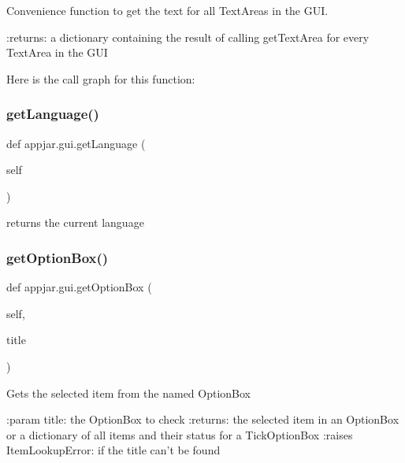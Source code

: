 \begin{DoxyVerb}Convenience function to get the text for all TextAreas in the GUI.

:returns: a dictionary containing the result of calling getTextArea for every TextArea in the GUI
\end{DoxyVerb}
 Here is the call graph for this function\+:
\mbox{\label{classappjar_1_1gui_a456aad9d9af68d845d12657ef103e4f6}} 
\subsubsection{\texorpdfstring{get\+Language()}{getLanguage()}}
{\footnotesize\ttfamily def appjar.\+gui.\+get\+Language (\begin{DoxyParamCaption}\item[{}]{self }\end{DoxyParamCaption})}

\begin{DoxyVerb}returns the current language \end{DoxyVerb}
 \mbox{\label{classappjar_1_1gui_abacd02677277cb43514dcf2298ac3674}} 
\subsubsection{\texorpdfstring{get\+Option\+Box()}{getOptionBox()}}
{\footnotesize\ttfamily def appjar.\+gui.\+get\+Option\+Box (\begin{DoxyParamCaption}\item[{}]{self,  }\item[{}]{title }\end{DoxyParamCaption})}

\begin{DoxyVerb}Gets the selected item from the named OptionBox

:param title: the OptionBox to check
:returns: the selected item in an OptionBox or a dictionary of all items and their status for a TickOptionBox
:raises ItemLookupError: if the title can't be found
\end{DoxyVerb}
 \mbox{\label{classappjar_1_1gui_abab8897e9d736a72a96a6d87aa2516e8}} 
